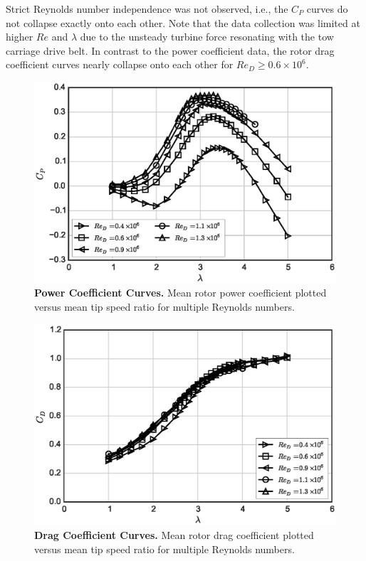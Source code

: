 \documentclass[10pt,letterpaper]{article}
\begin{document}
Strict Reynolds number independence was not observed, i.e., the $C_P$ curves do
not collapse exactly onto each other. Note that the data collection was limited
at higher $Re$ and $\lambda$ due to the unsteady turbine force resonating with
the tow carriage drive belt. In contrast to the power coefficient data, the
rotor drag coefficient curves nearly collapse onto each other for $Re_D \ge 0.6
\times 10^6$.

\begin{figure}[h]
    \includegraphics[width=\textwidth]{figures/cp_curves.eps}

    \caption{{\bf Power Coefficient Curves.} Mean rotor power coefficient
    plotted versus mean tip speed ratio for multiple Reynolds numbers.}

    \label{fig:cp-curves}
\end{figure}

\begin{figure}[h]
    \includegraphics[width=\textwidth]{figures/cd_curves.eps}

    \caption{{\bf Drag Coefficient Curves.} Mean rotor drag coefficient plotted
    versus mean tip speed ratio for multiple Reynolds numbers.}

    \label{fig:cd-curves}
\end{figure}
\end{document}
